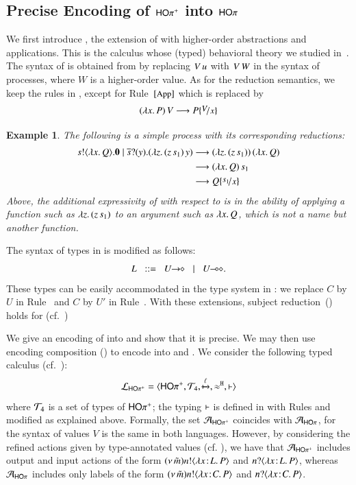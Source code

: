 \documentclass[preprint,11pt]{elsarticle}
\newtheorem{example}{Example}[section]
\begin{document}
{{%
\subsection{Precise Encoding of $\mathsf{HO\pi^{+}}$ into $\mathsf{HO}\pi$}
We first introduce \HOpp, the  extension of \HOp with higher-order abstractions and applications.
This is the calculus whose (typed) behavioral theory we studied in~\cite{characteristic_bis,KouzapasPY17}. The syntax of \HOpp is obtained 
from   by replacing 
$V\, {u}$ with  $V\, {W}$ in the syntax of processes, where  $W$ is a higher-order value. 
As for the reduction semantics, we keep the rules in , except for 
 Rule~${\scriptsize{[\textrm{\small App}]}}$ which is replaced by 
$$
	\appl{(\abs{x}{P})}{V} \red P \subst{V}{x}
$$

\begin{example}\label{ex:hopp}
The following is a simple \HOpp process with its corresponding reductions:
\begin{align*}
\bout{s}{\abs{x}{Q}}\inact  \Par \binp{\dual{s}}{y}(\appl{\abs{z}{(\appl{z}{s_1}})}{y}) 
& \red 
\appl{(\abs{z}{(\appl{z}{s_1}}))}{(\abs{x}{Q})}
\\
& \red 
\appl{(\abs{x}{Q})}{s_1}
\\
& \red Q\subst{s_1}{x}
\end{align*}
Above, the additional expressivity of \HOpp with respect to \HOp is in the ability of applying a function such as 
$\lambda z.\,(z\, {s_1})$ to an argument such as $\lambda x.\,Q$, which is not a name but another function.
\end{example}


		The syntax of types in  is modified as follows: %
$$
		L \bnfis \shot{U} \bnfbar \lhot{U}.
$$
These types can be easily accommodated in the type system 
in :
we replace $C$ by $U$ in Rule~ and $C$ by $U'$ in Rule~. 
With these extensions, subject
reduction~() holds for \HOpp (cf.~\cite{characteristic_bis})

We give  %
an encoding of \HOpp into \HOp and show that it is precise. 
We may then use encoding composition () to encode
\HOpp into \HO and \sessp.
We consider the following 
typed calculus (cf.~):
$$\mathcal{L}_{\mathsf{HO\pi^{+}}}=\langle \mathsf{HO\pi^{+}}, {\cal{T}}_4, \xmapsto{\ell}, \approx^\mathtt{H}, \vdash \rangle$$
where 
	${\cal{T}}_4$ is a set of types of $\mathsf{HO\pi^{+}}$;  
the typing $\vdash$ is defined in 
with Rules  and  modified as explained above.
Formally, the set   
$\mathcal{A}_\mathsf{HO\pi^{+}}$ coincides with $\mathcal{A}_{\mathsf{HO}\pi}$, for the syntax of values $V$ is the same in both languages.
However, by considering the refined actions given by type-annotated values (cf. ),
we have that   $\mathcal{A}_\mathsf{HO\pi^{+}}$
includes output and input actions of the form
$(\nu\, \tilde{m}) n ! \langle \lambda x \! : \! L.\,P \rangle$
and
${n ? \langle \lambda x \! : \! L.\,P \rangle}$, whereas $\mathcal{A}_{\mathsf{HO}\pi}$ includes only labels of the form
$(\nu\, \tilde{m}) n ! \langle \lambda x \! : \! C.\,P \rangle$
and
${n ? \langle \lambda x \! : \! C.\,P \rangle}$.

}}
\end{document}
